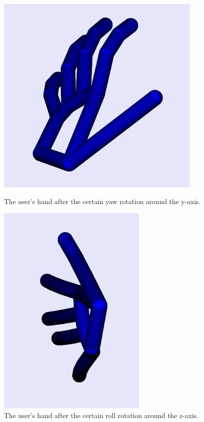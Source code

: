 \begin{figure}[H]
    \centering
    \begin{minipage}{0.5\textwidth}
        \centering
        \includegraphics[scale=.55]{Figures/4_handYaw.JPG} 
        \caption[Hand with Yaw Rotation]{The user's hand after the certain yaw rotation around the y-axis.}
		\label{fig:handYaw}
    \end{minipage}\hfill
    \begin{minipage}{0.5\textwidth}
        \centering
        \includegraphics[scale=.55]{Figures/4_handRoll.JPG}
        \caption[Hand with Roll Rotation]{The user's hand after the certain roll rotation around the z-axis.}
        \label{fig:handRoll}
    \end{minipage}
\end{figure}
